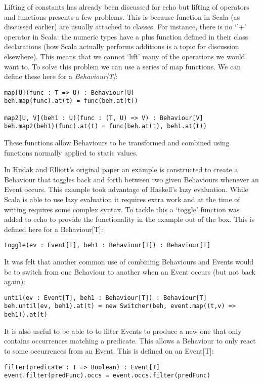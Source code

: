       Lifting of constants has already been discussed for echo but lifting of operators and
      functions presents a few problems. This is because function in Scala (as discussed earlier)
      are usually attached to classes. For instance, there is no `'+' operator in Scala: the numeric
      types have a plus function defined in their class declarations (how Scala actually performs additions
      is a topic for discussion elsewhere). This means that we cannot `lift' many of the operations we
      would want to. To solve this problem we can use a series of map functions. We can define these
      here for a \emph{Behaviour[T]}:

\begin{verbatim}
map[U](func : T => U) : Behaviour[U]
beh.map(func).at(t) = func(beh.at(t))

map2[U, V](beh1 : U)(func : (T, U) => V) : Behaviour[V]
beh.map2(beh1)(func).at(t) = func(beh.at(t), beh1.at(t))
\end{verbatim}        

      These functions allow Behaviours to be transformed and combined using functions
      normally applied to static values.
      
      In Hudak and Elliott's original paper an example is constructed to create a Behaviour
      that toggles back and forth between two given Behaviours whenever an Event occurs. This
      example took advantage of Haskell's lazy evaluation. While Scala is able to use lazy evaluation
      it requires extra work and at the time of writing requires some complex syntax. To tackle this
      a `toggle' function was added to echo to provide the functionality in the example out of the box.
      This is defined here for a Behaviour[T]:
      
\begin{verbatim}
toggle(ev : Event[T], beh1 : Behaviour[T]) : Behaviour[T]
\end{verbatim}        
      
      It was felt that another common use of combining Behaviours and Events would be
      to switch from one Behaviour to another when an Event occurs (but not back again):

\begin{verbatim}
until(ev : Event[T], beh1 : Behaviour[T]) : Behaviour[T]
beh.until(ev, beh1).at(t) = new Switcher(beh, event.map((t,v) => beh1)).at(t)
\end{verbatim}        
      
      It is also useful to be able to to filter Events to produce a new one that only
      contains occurrences matching a predicate. This allows a Behaviour to only react
      to some occurrences from an Event. This is defined on an Event[T]:

\begin{verbatim}
filter(predicate : T => Boolean) : Event[T]
event.filter(predFunc).occs = event.occs.filter(predFunc)
\end{verbatim}        